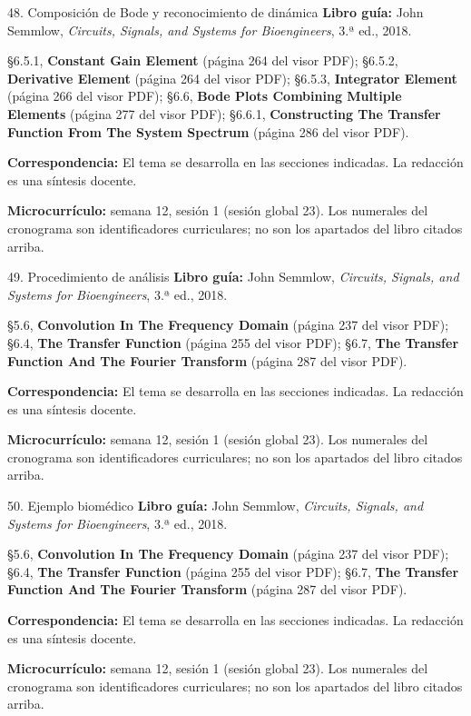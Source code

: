 \documentclass[
  10pt,
  ignorenonframetext,
  aspectratio=169,
  spanish,
]{beamer}
\begin{document}
\begin{frame}{48. Composición de Bode y reconocimiento de dinámica}
\label{composiciuxf3n-de-bode-y-reconocimiento-de-dinuxe1mica}
\textbf{Libro guía:} John Semmlow, \emph{Circuits, Signals, and Systems
for Bioengineers}, 3.ª ed., 2018.

§6.5.1, \textbf{Constant Gain Element} (página 264 del visor PDF);
§6.5.2, \textbf{Derivative Element} (página 264 del visor PDF); §6.5.3,
\textbf{Integrator Element} (página 266 del visor PDF); §6.6,
\textbf{Bode Plots Combining Multiple Elements} (página 277 del visor
PDF); §6.6.1, \textbf{Constructing The Transfer Function From The System
Spectrum} (página 286 del visor PDF).

\textbf{Correspondencia:} El tema se desarrolla en las secciones
indicadas. La redacción es una síntesis docente.

\textbf{Microcurrículo:} semana 12, sesión 1 (sesión global 23). Los
numerales del cronograma son identificadores curriculares; no son los
apartados del libro citados arriba.
\end{frame}

\begin{frame}{49. Procedimiento de análisis}
\label{procedimiento-de-anuxe1lisis-2}
\textbf{Libro guía:} John Semmlow, \emph{Circuits, Signals, and Systems
for Bioengineers}, 3.ª ed., 2018.

§5.6, \textbf{Convolution In The Frequency Domain} (página 237 del visor
PDF); §6.4, \textbf{The Transfer Function} (página 255 del visor PDF);
§6.7, \textbf{The Transfer Function And The Fourier Transform} (página
287 del visor PDF).

\textbf{Correspondencia:} El tema se desarrolla en las secciones
indicadas. La redacción es una síntesis docente.

\textbf{Microcurrículo:} semana 12, sesión 1 (sesión global 23). Los
numerales del cronograma son identificadores curriculares; no son los
apartados del libro citados arriba.
\end{frame}

\begin{frame}{50. Ejemplo biomédico}
\label{ejemplo-biomuxe9dico-2}
\textbf{Libro guía:} John Semmlow, \emph{Circuits, Signals, and Systems
for Bioengineers}, 3.ª ed., 2018.

§5.6, \textbf{Convolution In The Frequency Domain} (página 237 del visor
PDF); §6.4, \textbf{The Transfer Function} (página 255 del visor PDF);
§6.7, \textbf{The Transfer Function And The Fourier Transform} (página
287 del visor PDF).

\textbf{Correspondencia:} El tema se desarrolla en las secciones
indicadas. La redacción es una síntesis docente.

\textbf{Microcurrículo:} semana 12, sesión 1 (sesión global 23). Los
numerales del cronograma son identificadores curriculares; no son los
apartados del libro citados arriba.
\end{frame}
\end{document}
